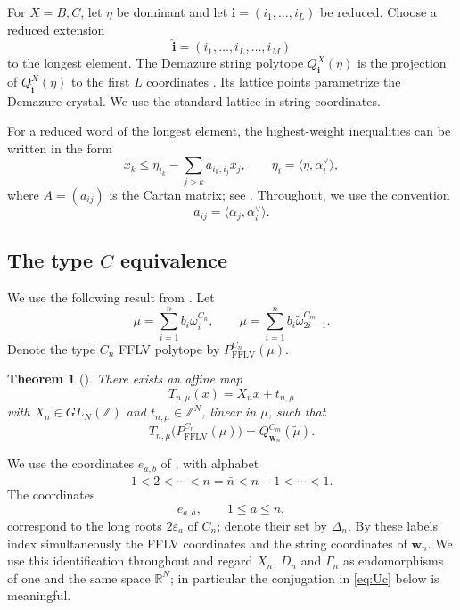 \documentclass[a4paper, 12pt]{amsart}
\newtheorem{theorem}{Theorem}[section]
\newcommand{\FFLV}{\mathrm{FFLV}}
\newcommand{\ZZ}{\mathbb Z}
\newcommand{\RR}{\mathbb R}
\newcommand{\ww}{\mathbf w}
\newcommand{\eps}{\varepsilon}
\begin{document}
For $X=B,C$, let $\eta$ be dominant and let $\mathbf i=(i_1,\ldots,i_L)$ be reduced. Choose a reduced extension
\[
              \widehat{\mathbf i}=(i_1,\ldots,i_L,\ldots,i_M)
\]
to the longest element. 
The Demazure string polytope $Q_{\mathbf i}^{X}(\eta)$ is the projection of
$Q_{\widehat{\mathbf i}}^{X}(\eta)$ to the first
$L$ coordinates \cite{Cal02}.
Its lattice points parametrize the Demazure crystal.
We use the standard lattice in string coordinates.

For a reduced word of the longest element, the highest-weight inequalities can be written in the form
\begin{equation}\label{eq:littelmann}
 x_k\leq \eta_{i_k}-\sum_{j>k}a_{i_k,i_j}x_j,
 \qquad
 \eta_i=\langle\eta,\alpha_i^\vee\rangle,
\end{equation}
where $A=(a_{ij})$ is the Cartan matrix; see \cite{Lit98,BZ01}. Throughout, we use the convention
\[
        a_{ij}=\langle\alpha_j,\alpha_i^\vee\rangle .
\]

\subsection{The type $C$ equivalence}

We use the following result from \cite{CFL24}. Let
\[
                  \mu=\sum_{i=1}^n b_i\omega_i^{C_n},
 \qquad
                  \widetilde\mu=\sum_{i=1}^n b_i\widetilde\omega_{2i-1}^{C_m}.
\]
Denote the type $C_n$ FFLV polytope by $P_{\FFLV}^{C_n}(\mu)$.

\begin{theorem}[{\cite[Theorem~3.1]{CFL24}}]\label{thm:CFL}
There exists an affine map
\[
                    T_{n,\mu}(x)=X_nx+t_{n,\mu}
\]
with $X_n\in GL_N(\ZZ)$ and $t_{n,\mu}\in\ZZ^N$, linear in $\mu$, such that
\[
 T_{n,\mu}\bigl(P_{\FFLV}^{C_n}(\mu)\bigr)
      =Q_{\ww_n}^{C_m}(\widetilde\mu).
\]
\end{theorem}

We use the coordinates $e_{a,b}$ of \cite[Section~4]{CFL24}, with alphabet
\[
 1<2<\cdots<n=\bar n<\overline{n-1}<\cdots<\bar1.
\]
The coordinates
\[
                         e_{a,\bar a},\qquad 1\leq a\leq n,
\]
correspond to the long roots $2\eps_a$ of $C_n$; denote their set by $\Delta_n$. By \cite[Notation~4.10]{CFL24} these labels index simultaneously the FFLV coordinates and the string coordinates of $\ww_n$. 
We use this identification throughout and regard $X_n$, $D_n$ and $\Gamma_n$ as endomorphisms of one and the same space $\RR^N$; in particular the conjugation in \eqref{eq:Uc} below is meaningful.
\end{document}
